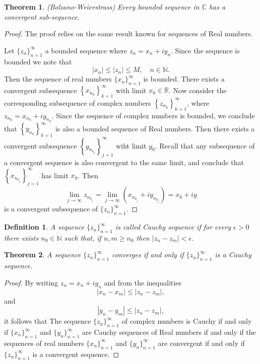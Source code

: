 \documentclass{amsart}
\newtheorem{thm}{Theorem}
\newtheorem{mydef}{Definition}
\begin{document}
\begin{thm}
(Bolzano-Weierstrass) Every bounded sequence in \(\mathbb{C}\) has a convergent sub-sequence.
\end{thm}
\begin{proof}
The proof relies on the same result known for sequences of Real numbers.

Let \(\{z_n\}_{n=1}^{\infty}\) a bounded sequence where \(z_n = x_n + iy_n\). Since the sequence is bounded we note  that 
\[ |x_n | \leq |z_n| \leq M, \quad n\in\mathbb{N}. \]
Then the sequence of real numbers \(\{x_n\}_{n=1}^{\infty}\) is bounded. There exists a convergent subsequence \(\left\{x_{n_k}\right\}_{k=1}^{\infty}\) with limit \(x_0\in \mathbb{R}\).
Now consider the corresponding subsequence of complex numbers \(\left\{z_{n_k}\right\}_{k=1}^{\infty}\), where \(z_{n_k} = x_{n_k} + i y_{n_k}\). Since the sequence of complex numbers is bounded,
we conclude that \(\left\{y_{n_k}\right\}_{k=1}^{\infty}\) is also a bounded sequence of Real numbers. Then there exists a convergent subsequence \(\left\{y_{n_{k_j}}\right\}_{j=1}^{\infty}\) wiht limit \(y_0\).
Recall that any subsequence of a convergent sequence is also convergent to the same limit, and conclude that \(\left\{x_{n_{k_j}}\right\}_{j=1}^{\infty}\) has limit \(x_0\). Then 
\[ \lim_{j\to \infty} z_{n_{k_j}} = \lim_{j\to \infty} \left(x_{n_{k_j}} + i y_{n_{k_j}}\right)  = x_0 + iy \]
is a convergent subsequence of  \(\{z_n\}_{n=1}^{\infty}\).
\end{proof}

\begin{mydef}
A sequence \(\{z_n\}_{n=1}^{\infty}\) is called Cauchy sequence if for every \(\epsilon >0\)
there exists \(n_0\in\mathbb{N}\) such that, if \(n,m \geq n_0\) then \(|z_n - z_m| <\epsilon\).
\end{mydef}


\begin{thm}
A sequence \(\{z_n\}_{n=1}^{\infty}\) converges if and only if \(\{z_n\}_{n=1}^{\infty}\) is a Cauchy sequence.
\end{thm}
\begin{proof}
By writing \(z_n = x_n + i y_n\) and from the inequalities
\[ |x_n - x_m | \leq |z_n - z_m|, \]
and
\[ |y_n - y_m | \leq |z_n - z_m|, \]
it follows that The sequence  \(\{z_n\}_{n=1}^{\infty}\) of complex numbers is Cauchy if and only if  \(\{x_n\}_{n=1}^{\infty}\) and \(\{y_n\}_{n=1}^{\infty}\) are Cauchy sequences of Real numbers if and only if  the sequences of real numbers \(\{x_n\}_{n=1}^{\infty}\) and \(\{y_n\}_{n=1}^{\infty}\) are convergent if and only if \(\{z_n\}_{n=1}^{\infty}\) is a convergent sequence.
\end{proof}
\end{document}
